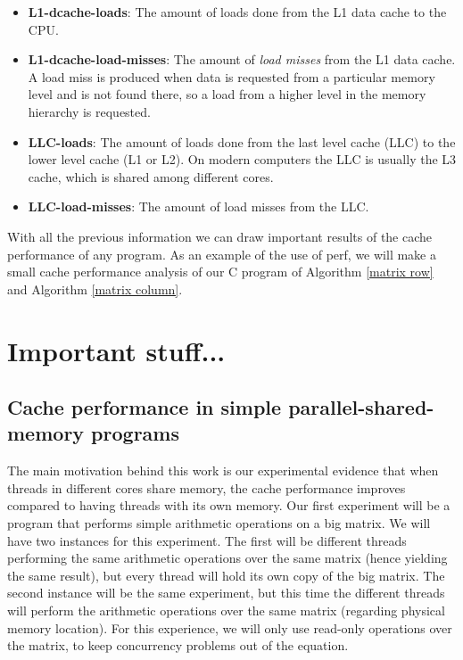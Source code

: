 \documentclass[12pt]{diicc}
\begin{document}
\begin{itemize}
\item \textbf{L1-dcache-loads}: The amount of loads done from the L1 data cache to the CPU.
\item \textbf{L1-dcache-load-misses}: The amount of \textit{load misses} from the L1 data cache. A load miss is produced when data is requested from a particular memory level and is not found there, so a load from a higher level in the memory hierarchy is requested.
\item \textbf{LLC-loads}: The amount of loads done from the last level cache (LLC) to the lower level cache (L1 or L2). On modern computers the LLC is usually the L3 cache, which is shared among different cores.
\item \textbf{LLC-load-misses}: The amount of load misses from the LLC.
\end{itemize}

With all the previous information we can draw important results of the cache performance of any program. As an example of the use of perf, we will make a small cache performance analysis of our C program of Algorithm \ref{matrix row} and Algorithm \ref{matrix column}.

%  
\chapter{Important stuff...}\label{chap:contributions}

\section{Cache performance in simple parallel-shared-memory programs}
The main motivation behind this work is our experimental evidence that when threads in different cores share memory, the cache performance improves compared to having threads with its own memory. Our first experiment will be a program that performs simple arithmetic operations on a big matrix. We will have two instances for this experiment. The first will be different threads performing the same arithmetic operations over the same matrix (hence yielding the same result), but every thread will hold its own copy of the big matrix. The second instance will be the same experiment, but this time the different threads will perform the arithmetic operations over the same matrix (regarding physical memory location). For this experience, we will only use read-only operations over the matrix, to keep concurrency problems out of the equation.
\end{document}
